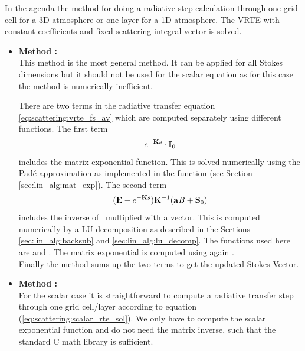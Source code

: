 \label{sec:scattering:rte_step}
In the agenda  the method for doing a
radiative step calculation through one grid cell for a 3D atmosphere
or one layer for a 1D atmosphere. The VRTE with constant coefficients and fixed scattering integral vector is solved.

\begin{itemize}
\item {\bf Method :}\\
This method is the most general method. It can be applied for all
Stokes dimensions but it should not be used for the scalar equation as
for this case the method is numerically inefficient. 

There are two terms in the radiative transfer equation
\ref{eq:scattering:vrte_fs_av} which are
computed separately using different functions. The first term 
\begin{equation}
 e^{-{\bf K} s}\cdot{\bf I}_0
\end{equation}
includes the matrix exponential function. This is solved numerically
using the Pad\'e approximation as implemented in the function 
 (see Section \ref{sec:lin_alg:mat_exp}).
The second term 
\begin{equation}
({\bf E} - e^{-{\bf K}
    s}) {\bf K}^{-1} ({\bf a} B + {\bf S}_0)
\end{equation}
includes the inverse of \ExtMat\ multiplied with a vector. This is
computed numerically by a LU decomposition as described in the
Sections \ref{sec:lin_alg:backsub} and
\ref{sec:lin_alg:lu_decomp}. The functions used here are
 and . The matrix exponential is
computed using again .\\
Finally the method sums up the two terms to get the updated Stokes Vector. 
 
\item {\bf Method :}\\
For the scalar case it is straightforward to compute a radiative
transfer step through one grid cell/layer according to equation
(\ref{eq:scattering:scalar_rte_sol}). We only
have to compute the scalar exponential function and do not need the
matrix inverse, such that the standard C math library is sufficient.
\end{itemize}


